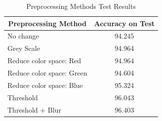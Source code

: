 \documentclass[a4paper,10pt,english]{article}
\begin{document}
    \vspace{10pt}
    \begin{table}[h!]
        \centering
        \caption{Preprocessing Methods Test Results}
        \label{tab:preprocessing}
        \begin{tabular}{|l|c|}
            \hline
            \multicolumn{1}{|c|}{\textbf{Preprocessing Method}} & \textbf{Accuracy on Test} \\ \hline
            No change                                           & 94.245                    \\ \hline
            Grey Scale                                          & 94.964                    \\ \hline
            Reduce color space: Red                             & 94.964                    \\ \hline
            Reduce color space: Green                           & 94.604                    \\ \hline
            Reduce color space: Blue                            & 95.324                    \\ \hline
            Threshold                                           & 96.043                    \\ \hline
            Threshold + Blur                                    & \cellcolor{green!25}96.403                    \\ \hline
        \end{tabular}
    \end{table}
    
\end{document}
